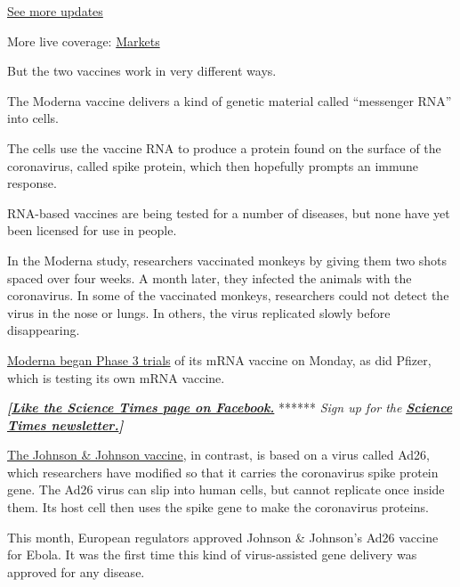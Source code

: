 \href{https://www.nytimes.com/2020/08/01/world/coronavirus-covid-19.html?action=click\&pgtype=Article\&state=default\&region=MAIN_CONTENT_1\&context=storylines_live_updates}{See
more updates}

More live coverage:
\href{https://www.nytimes.com/live/2020/07/31/business/stock-market-today-coronavirus?action=click\&pgtype=Article\&state=default\&region=MAIN_CONTENT_1\&context=storylines_live_updates}{Markets}

But the two vaccines work in very different ways.

The Moderna vaccine delivers a kind of genetic material called
``messenger RNA'' into cells.

The cells use the vaccine RNA to produce a protein found on the surface
of the coronavirus, called spike protein, which then hopefully prompts
an immune response.

RNA-based vaccines are being tested for a number of diseases, but none
have yet been licensed for use in people.

In the Moderna study, researchers vaccinated monkeys by giving them two
shots spaced over four weeks. A month later, they infected the animals
with the coronavirus. In some of the vaccinated monkeys, researchers
could not detect the virus in the nose or lungs. In others, the virus
replicated slowly before disappearing.

\href{https://www.nytimes.com/2020/07/27/health/moderna-vaccine-covid.html}{Moderna
began Phase 3 trials} of its mRNA vaccine on Monday, as did Pfizer,
which is testing its own mRNA vaccine.

\textbf{\emph{{[}}\href{http://on.fb.me/1paTQ1h}{\emph{Like the Science
Times page on Facebook.}}} ****** \emph{\textbar{} Sign up for the}
\textbf{\href{http://nyti.ms/1MbHaRU}{\emph{Science Times
newsletter.}}\emph{{]}}}

\href{https://www.nytimes.com/2020/07/17/health/coronavirus-vaccine-johnson-janssen.html}{The
Johnson \& Johnson vaccine}, in contrast, is based on a virus called
Ad26, which researchers have modified so that it carries the coronavirus
spike protein gene. The Ad26 virus can slip into human cells, but cannot
replicate once inside them. Its host cell then uses the spike gene to
make the coronavirus proteins.

This month, European regulators approved Johnson \& Johnson's Ad26
vaccine for Ebola. It was the first time this kind of virus-assisted
gene delivery was approved for any disease.

